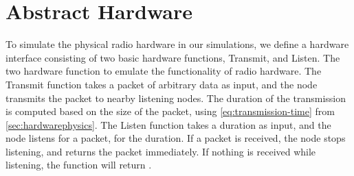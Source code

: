 \section{Abstract Hardware}\label{sec:interface}
To simulate the physical radio hardware in our simulations, we define a hardware interface consisting of two
basic hardware functions, Transmit, and Listen. The two hardware function to emulate the functionality of
radio hardware. The Transmit function takes a packet of arbitrary data as input, and the node transmits the
packet to nearby listening nodes. The duration of the transmission is computed based on the size of the
packet, using \autoref{eq:transmission-time} from \autoref{sec:hardwarephysics}. The Listen function takes a
duration as input, and the node listens for a packet, for the duration. If a packet is received, the node
stops listening, and returns the packet immediately. If nothing is received while listening, the function will
return \KwNull. 

%




